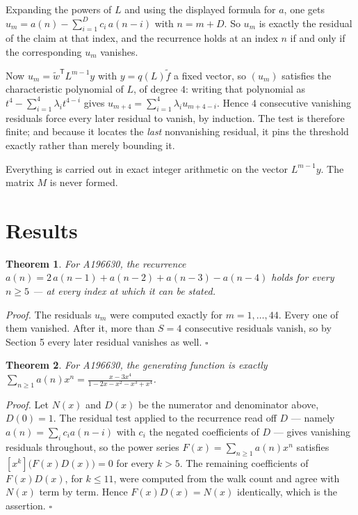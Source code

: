 \documentclass[11pt]{article}
\newtheorem{theorem}{Theorem}
\theoremstyle{definition}
\begin{document}
Expanding the powers of $L$ and using the displayed formula for $a$, one gets $u_m = a(n) - \sum_{i=1}^{D} c_i\,a(n-i)$ with $n = m + D$. So $u_m$ is exactly the residual of the claim at that index, and the recurrence holds at an index $n$ if and only if the corresponding $u_m$ vanishes.

Now $u_m = \tilde w^{\mathsf T} L^{m-1} y$ with $y = q(L)\tilde f$ a fixed vector, so $(u_m)$ satisfies the characteristic polynomial of $L$, of degree $4$: writing that polynomial as $t^{4} - \sum_{i=1}^{4} \lambda_i t^{4-i}$ gives $u_{m+4} = \sum_{i=1}^{4} \lambda_i u_{m+4-i}$. Hence $4$ consecutive vanishing residuals force every later residual to vanish, by induction. The test is therefore finite; and because it locates the {\itshape last} nonvanishing residual, it pins the threshold exactly rather than merely bounding it.

Everything is carried out in exact integer arithmetic on the vector $L^{m-1}y$. The matrix $M$ is never formed.

\section{Results}

\begin{theorem} For A196630, the recurrence $a(n) = 2\,a(n-1) + a(n-2) + a(n-3) - a(n-4)$ holds for every $n \ge 5$ --- at every index at which it can be stated.\end{theorem}

{\itshape Proof.} The residuals $u_m$ were computed exactly for $m = 1,\dots,44$. Every one of them vanished. After it, more than $S = 4$ consecutive residuals vanish, so by Section 5 every later residual vanishes as well. $\square$

\begin{theorem} For A196630, the generating function is exactly $\sum_{n\ge 1} a(n)x^n = \frac{x - 3x^{4}}{1 - 2x - x^{2} - x^{3} + x^{4}}$.\end{theorem}

{\itshape Proof.} Let $N(x)$ and $D(x)$ be the numerator and denominator above, $D(0)=1$. The residual test applied to the recurrence read off $D$ --- namely $a(n) = \sum_i c_i a(n-i)$ with $c_i$ the negated coefficients of $D$ --- gives vanishing residuals throughout, so the power series $F(x)=\sum_{n\ge 1}a(n)x^n$ satisfies $[x^k]\bigl(F(x)D(x)\bigr) = 0$ for every $k > 5$. The remaining coefficients of $F(x)D(x)$, for $k \le 11$, were computed from the walk count and agree with $N(x)$ term by term. Hence $F(x)D(x) = N(x)$ identically, which is the assertion. $\square$
\end{document}
